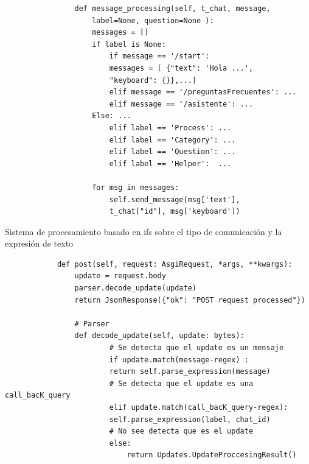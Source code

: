         \begin{listing}
            \begin{verbatim}
                def message_processing(self, t_chat, message, 
                    label=None, question=None ):
                    messages = []
                    if label is None:
                        if message == '/start':
                        messages = [ {"text": 'Hola ...',
                        "keyboard": {}},...]
                        elif message == '/preguntasFrecuentes': ...
                        elif message == '/asistente': ... 
                    Else: ...
                        elif label == 'Process': ...
                        elif label == 'Category': ...
                        elif label == 'Question': ...
                        elif label == 'Helper':  ...
                    
                    for msg in messages:
                        self.send_message(msg['text'],
                        t_chat["id"], msg['keyboard'])
            \end{verbatim}
             \caption[sistema de procesamiento anterior]{Sistema de procesamiento basado en ifs sobre el tipo de comunicación y la expresión de texto}
        \end{listing}

        \begin{verbatim}
            def post(self, request: AsgiRequest, *args, **kwargs):
                update = request.body
                parser.decode_update(update)
                return JsonResponse({"ok": "POST request processed"})
            
                # Parser
                def decode_update(self, update: bytes):
                        # Se detecta que el update es un mensaje
                        if update.match(message-regex) :
                        return self.parse_expression(message)
                        # Se detecta que el update es una call_bacK_query
                        elif update.match(call_bacK_query-regex):
                        self.parse_expression(label, chat_id)
                        # No see detecta que es el update
                        else:
                            return Updates.UpdateProccesingResult()
        \end{verbatim}



